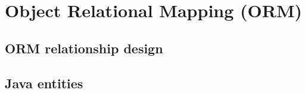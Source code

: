 
\chapter{Object Relational Mapping (ORM)}
\label{chap:orm}

\section{ORM relationship design}
\blindtext

\section{Java entities}
\blindtext
